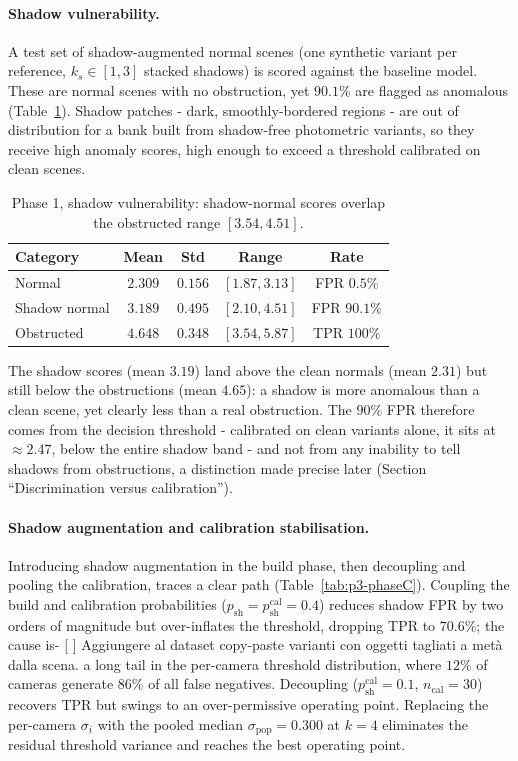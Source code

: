 \paragraph{Shadow vulnerability.}
A test set of shadow-augmented normal scenes (one synthetic variant per
reference, $k_s\in[1,3]$ stacked shadows) is scored against the baseline model.
These are normal scenes with no obstruction, yet $90.1\%$ are flagged as anomalous
(Table~\ref{tab:p3-phaseB}). Shadow patches - dark, smoothly-bordered regions -
are out of distribution for a bank built from shadow-free photometric variants, so
they receive high anomaly scores, high enough to exceed a threshold calibrated on
clean scenes.

\begin{table}[h]
  \centering
  \begin{tabular}{lcccc}
    \hline
    Category & Mean & Std & Range & Rate \\
    \hline
    Normal & $2.309$ & $0.156$ & $[1.87, 3.13]$ & FPR $0.5\%$ \\
    Shadow normal & $3.189$ & $0.495$ & $[2.10, 4.51]$ & FPR $90.1\%$ \\
    Obstructed & $4.648$ & $0.348$ & $[3.54, 5.87]$ & TPR $100\%$ \\
    \hline
  \end{tabular}
  \caption{Phase 1, shadow vulnerability: shadow-normal scores overlap the
  obstructed range $[3.54, 4.51]$.}
  \label{tab:p3-phaseB}
\end{table}

The shadow scores (mean $3.19$) land above the clean normals (mean $2.31$) but
still below the obstructions (mean $4.65$): a shadow is more anomalous than a clean
scene, yet clearly less than a real obstruction. The $90\%$ FPR therefore comes
from the decision threshold - calibrated on clean variants alone, it sits at
$\approx 2.47$, below the entire shadow band - and not from any inability to tell
shadows from obstructions, a distinction made precise later
(Section ``Discrimination versus calibration'').

\paragraph{Shadow augmentation and calibration stabilisation.}
Introducing shadow augmentation in the build phase, then decoupling and pooling
the calibration, traces a clear path (Table~\ref{tab:p3-phaseC}). Coupling the
build and calibration probabilities ($p_{\mathrm{sh}} =
p_{\mathrm{sh}}^{\mathrm{cal}} = 0.4$) reduces shadow FPR by two orders of
magnitude but over-inflates the threshold, dropping TPR to $70.6\%$; the cause is- [ ] Aggiungere al dataset copy-paste varianti con oggetti tagliati a metà dalla
      scena.
a long tail in the per-camera threshold distribution, where $12\%$ of cameras
generate $86\%$ of all false negatives. Decoupling
($p_{\mathrm{sh}}^{\mathrm{cal}} = 0.1$, $n_{\mathrm{cal}} = 30$) recovers TPR but
swings to an over-permissive operating point. Replacing the per-camera $\sigma_i$
with the pooled median $\sigma_{\mathrm{pop}} = 0.300$ at $k=4$ eliminates the
residual threshold variance and reaches the best operating point.

